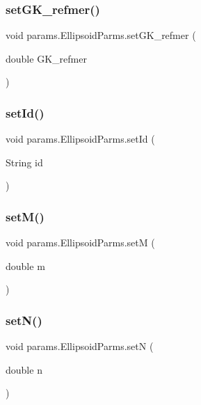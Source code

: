 \subsubsection{\texorpdfstring{set\+G\+K\+\_\+refmer()}{setGK\_refmer()}}
{\footnotesize\ttfamily void params.\+Ellipsoid\+Parms.\+set\+G\+K\+\_\+refmer (\begin{DoxyParamCaption}\item[{double}]{G\+K\+\_\+refmer }\end{DoxyParamCaption})}

\mbox{\label{classparams_1_1_ellipsoid_parms_a39defb526e42409be9d233cc5f51d17c}} 
\subsubsection{\texorpdfstring{set\+Id()}{setId()}}
{\footnotesize\ttfamily void params.\+Ellipsoid\+Parms.\+set\+Id (\begin{DoxyParamCaption}\item[{String}]{id }\end{DoxyParamCaption})}

\mbox{\label{classparams_1_1_ellipsoid_parms_ad33bd8b9852b20794f1c5b5cd024e51c}} 
\subsubsection{\texorpdfstring{set\+M()}{setM()}}
{\footnotesize\ttfamily void params.\+Ellipsoid\+Parms.\+setM (\begin{DoxyParamCaption}\item[{double}]{m }\end{DoxyParamCaption})}

\mbox{\label{classparams_1_1_ellipsoid_parms_a498387541756991907783083c45a457c}} 
\subsubsection{\texorpdfstring{set\+N()}{setN()}}
{\footnotesize\ttfamily void params.\+Ellipsoid\+Parms.\+setN (\begin{DoxyParamCaption}\item[{double}]{n }\end{DoxyParamCaption})}

